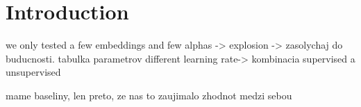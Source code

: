 \chapter*{Introduction}
\* %
\* %

{}
\* %

\* %
\* %
\* %


{}
\* %


{}
\* %
\* %
\* %
\* %
\* we only tested a few embeddings and few  alphas -> explosion  -> zasolychaj do buducnosti.
tabulka parametrov
different learning rate-> 
\* 
kombinacia supervised a unsupervised

        
        
{}
\* mame baseliny, len preto, ze nas to zaujimalo
\* zhodnot medzi sebou



{}


{}
\* %



\* %
